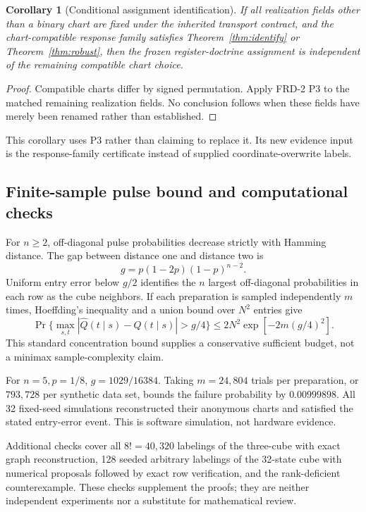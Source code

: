 \documentclass[11pt]{article}
\newtheorem{corollary}[theorem]{Corollary}
\theoremstyle{definition}\newtheorem{definition}[theorem]{Definition}
\theoremstyle{remark}\newtheorem{remark}[theorem]{Remark}
\begin{document}
\begin{corollary}[Conditional assignment identification]
If all realization fields other than a binary chart are fixed under the inherited transport contract, and the chart-compatible response family satisfies Theorem~\ref{thm:identify} or Theorem~\ref{thm:robust}, then the frozen register-doctrine assignment is independent of the remaining compatible chart choice.
\end{corollary}
\begin{proof}
Compatible charts differ by signed permutation. Apply FRD-2 P3 to the matched remaining realization fields. No conclusion follows when these fields have merely been renamed rather than established.
\end{proof}
This corollary uses P3 rather than claiming to replace it. Its new evidence input is the response-family certificate instead of supplied coordinate-overwrite labels.

\subsection{Finite-sample pulse bound and computational checks}
For $n\ge2$, off-diagonal pulse probabilities decrease strictly with Hamming distance. The gap between distance one and distance two is
\begin{equation}
g=p(1-2p)(1-p)^{n-2}.
\end{equation}
Uniform entry error below $g/2$ identifies the $n$ largest off-diagonal probabilities in each row as the cube neighbors. If each preparation is sampled independently $m$ times, Hoeffding's inequality and a union bound over $N^2$ entries give
\begin{equation}
\Pr\{\max_{s,t}|\widehat Q(t\mid s)-Q(t\mid s)|>g/4\}
\le 2N^2\exp[-2m(g/4)^2].\label{eq:sampling}
\end{equation}
This standard concentration bound \cite{hoeffding} supplies a conservative sufficient budget, not a minimax sample-complexity claim.

For $n=5,p=1/8$, $g=1029/16384$. Taking $m=24{,}804$ trials per preparation, or $793{,}728$ per synthetic data set, bounds the failure probability by $0.00999898$. All 32 fixed-seed simulations reconstructed their anonymous charts and satisfied the stated entry-error event. This is software simulation, not hardware evidence.

Additional checks cover all $8!=40{,}320$ labelings of the three-cube with exact graph reconstruction, 128 seeded arbitrary labelings of the 32-state cube with numerical proposals followed by exact row verification, and the rank-deficient counterexample. These checks supplement the proofs; they are neither independent experiments nor a substitute for mathematical review.
\end{document}
